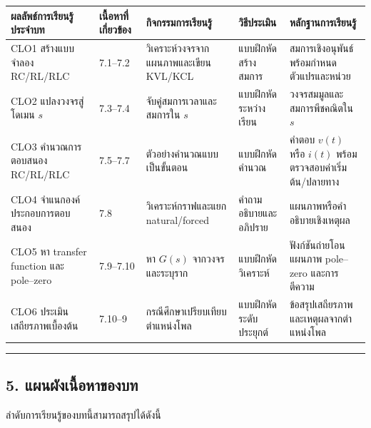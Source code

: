 \begin{table}[htbp]
    \centering
    \small
    \setlength{\tabcolsep}{4pt}
    \begin{tabularx}{\textwidth}{L{0.18\textwidth} L{0.12\textwidth} L{0.21\textwidth} L{0.17\textwidth} Y}
        \hline
        \textbf{ผลลัพธ์การเรียนรู้ประจำบท} & \textbf{เนื้อหาที่เกี่ยวข้อง} & \textbf{กิจกรรมการเรียนรู้} & \textbf{วิธีประเมิน} & \textbf{หลักฐานการเรียนรู้} \\
        \hline
        CLO1 สร้างแบบจำลอง RC/RL/RLC & 7.1–7.2 & วิเคราะห์วงจรจากแผนภาพและเขียน KVL/KCL & แบบฝึกหัดสร้างสมการ & สมการเชิงอนุพันธ์พร้อมกำหนดตัวแปรและหน่วย \\
        CLO2 แปลงวงจรสู่โดเมน $s$ & 7.3–7.4 & จับคู่สมการเวลาและสมการใน $s$ & แบบฝึกหัดระหว่างเรียน & วงจรสมมูลและสมการพีชคณิตใน $s$ \\
        CLO3 คำนวณการตอบสนอง RC/RL/RLC & 7.5–7.7 & ตัวอย่างคำนวณแบบเป็นขั้นตอน & แบบฝึกหัดคำนวณ & คำตอบ $v(t)$ หรือ $i(t)$ พร้อมตรวจสอบค่าเริ่มต้น/ปลายทาง \\
        CLO4 จำแนกองค์ประกอบการตอบสนอง & 7.8 & วิเคราะห์กราฟและแยก natural/forced & คำถามอธิบายและอภิปราย & แผนภาพหรือคำอธิบายเชิงเหตุผล \\
        CLO5 หา transfer function และ pole–zero & 7.9–7.10 & หา $G(s)$ จากวงจรและระบุราก & แบบฝึกหัดวิเคราะห์ & ฟังก์ชันถ่ายโอน แผนภาพ pole–zero และการตีความ \\
        CLO6 ประเมินเสถียรภาพเบื้องต้น & 7.10–9 & กรณีศึกษาเปรียบเทียบตำแหน่งโพล & แบบฝึกหัดระดับประยุกต์ & ข้อสรุปเสถียรภาพและเหตุผลจากตำแหน่งโพล \\
        \hline
    \end{tabularx}
\end{table}

\par\noindent\rule{\textwidth}{0.4pt}\par

\subsection{5. แผนผังเนื้อหาของบท}

ลำดับการเรียนรู้ของบทนี้สามารถสรุปได้ดังนี้

